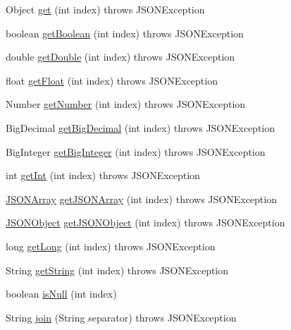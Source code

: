 \begin{DoxyCompactItemize}
\item 
Object \hyperlink{classorg_1_1json_1_1JSONArray_a3a8413753f53e0c0a5e008816c915eae}{get} (int index)  throws J\-S\-O\-N\-Exception 
\item 
boolean \hyperlink{classorg_1_1json_1_1JSONArray_ac7b9da6fc6276ca0211a5bfb80d0f059}{get\-Boolean} (int index)  throws J\-S\-O\-N\-Exception 
\item 
double \hyperlink{classorg_1_1json_1_1JSONArray_a1cd0e0c302e4acfe0393e6fbbc9a1c72}{get\-Double} (int index)  throws J\-S\-O\-N\-Exception 
\item 
float \hyperlink{classorg_1_1json_1_1JSONArray_af10a8724d6b2b77ec99e834f2a675d1a}{get\-Float} (int index)  throws J\-S\-O\-N\-Exception 
\item 
Number \hyperlink{classorg_1_1json_1_1JSONArray_afea94e2d9ced169765099b47fee63972}{get\-Number} (int index)  throws J\-S\-O\-N\-Exception 
\item 
Big\-Decimal \hyperlink{classorg_1_1json_1_1JSONArray_acac68b0bc223217f0e828da681f96421}{get\-Big\-Decimal} (int index)  throws J\-S\-O\-N\-Exception 
\item 
Big\-Integer \hyperlink{classorg_1_1json_1_1JSONArray_a64786a16ade2290e58a230e203897dfc}{get\-Big\-Integer} (int index)  throws J\-S\-O\-N\-Exception 
\item 
int \hyperlink{classorg_1_1json_1_1JSONArray_a1698dd185adbfa34dde18b2bef7f1e15}{get\-Int} (int index)  throws J\-S\-O\-N\-Exception 
\item 
\hyperlink{classorg_1_1json_1_1JSONArray}{J\-S\-O\-N\-Array} \hyperlink{classorg_1_1json_1_1JSONArray_a5d52943e4ca5982916b61aaa898dadad}{get\-J\-S\-O\-N\-Array} (int index)  throws J\-S\-O\-N\-Exception 
\item 
\hyperlink{classorg_1_1json_1_1JSONObject}{J\-S\-O\-N\-Object} \hyperlink{classorg_1_1json_1_1JSONArray_a7f3e6fc64826daba30f40964cd92e57e}{get\-J\-S\-O\-N\-Object} (int index)  throws J\-S\-O\-N\-Exception 
\item 
long \hyperlink{classorg_1_1json_1_1JSONArray_a7d8cb28bbbcc4d3a3b00700a12331b94}{get\-Long} (int index)  throws J\-S\-O\-N\-Exception 
\item 
String \hyperlink{classorg_1_1json_1_1JSONArray_a3b52ac3d94f48cdddf503e7872653591}{get\-String} (int index)  throws J\-S\-O\-N\-Exception 
\item 
boolean \hyperlink{classorg_1_1json_1_1JSONArray_a53362530300e3530297eb8ddaf74098d}{is\-Null} (int index)
\item 
String \hyperlink{classorg_1_1json_1_1JSONArray_ad0fbfe8fea05cdf7f06ddfe20db7c8c6}{join} (String separator)  throws J\-S\-O\-N\-Exception 

\end{DoxyCompactItemize}
